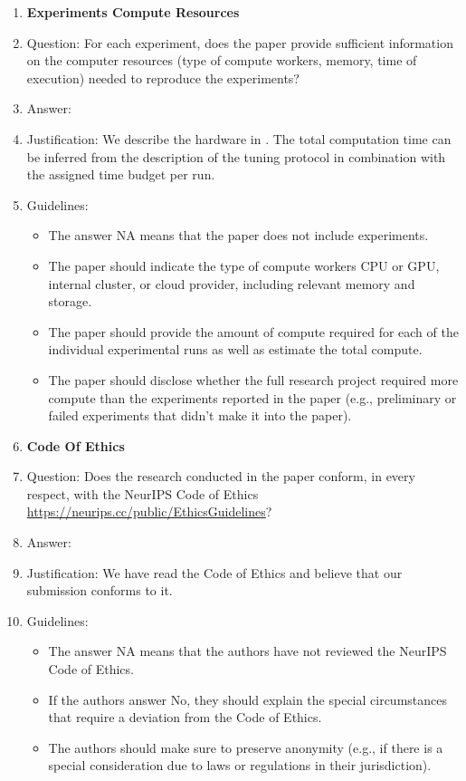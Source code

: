 \begin{enumerate}
\item {\bf Experiments Compute Resources}
\item[] Question: For each experiment, does the paper provide sufficient information on the computer resources (type of compute workers, memory, time of execution) needed to reproduce the experiments?
\item[] Answer: \answerYes{}
\item[] Justification: We describe the hardware in .
  The total computation time can be inferred from the description of the tuning protocol in combination with the assigned time budget per run.
\item[] Guidelines:
  \begin{itemize}
  \item The answer NA means that the paper does not include experiments.
  \item The paper should indicate the type of compute workers CPU or GPU, internal cluster, or cloud provider, including relevant memory and storage.
  \item The paper should provide the amount of compute required for each of the individual experimental runs as well as estimate the total compute.
  \item The paper should disclose whether the full research project required more compute than the experiments reported in the paper (e.g., preliminary or failed experiments that didn't make it into the paper).
  \end{itemize}

\item {\bf Code Of Ethics}
\item[] Question: Does the research conducted in the paper conform, in every respect, with the NeurIPS Code of Ethics \url{https://neurips.cc/public/EthicsGuidelines}?
\item[] Answer: \answerYes{}
\item[] Justification: We have read the Code of Ethics and believe that our submission conforms to it.
\item[] Guidelines:
  \begin{itemize}
  \item The answer NA means that the authors have not reviewed the NeurIPS Code of Ethics.
  \item If the authors answer No, they should explain the special circumstances that require a deviation from the Code of Ethics.
  \item The authors should make sure to preserve anonymity (e.g., if there is a special consideration due to laws or regulations in their jurisdiction).
  \end{itemize}



\end{enumerate}
